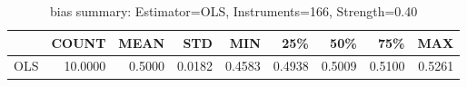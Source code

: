 \begin{table}[ht]
\centering
\caption{bias summary: Estimator=OLS, Instruments=166, Strength=0.40}
\begin{tabular}{lrrrrrrrr}
\toprule
 & COUNT & MEAN & STD & MIN & 25\% & 50\% & 75\% & MAX \\
\midrule
OLS & 10.0000 & 0.5000 & 0.0182 & 0.4583 & 0.4938 & 0.5009 & 0.5100 & 0.5261 \\
\bottomrule
\end{tabular}
\end{table}
